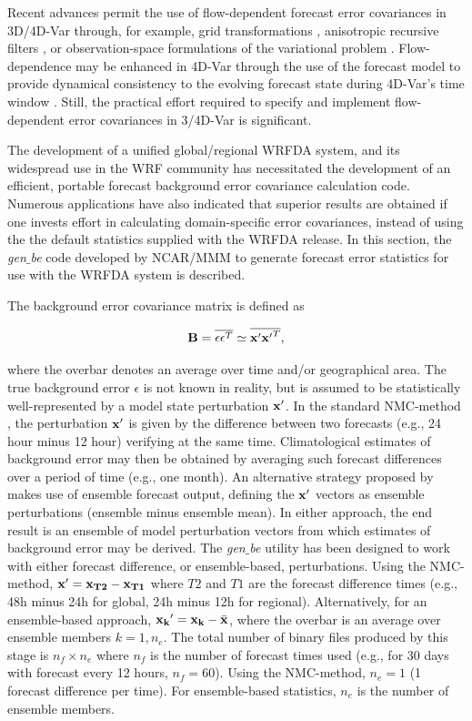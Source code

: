 Recent advances permit the use of flow-dependent forecast error
covariances in 3D/4D-Var through, for example, grid transformations
\citep{desroziers97}, anisotropic recursive filters
\citep{wu02, purser03},
or observation-space formulations of the variational 
problem \citep{daley01}. Flow-dependence may be enhanced in 4D-Var 
through the use of the forecast model to provide dynamical consistency to the evolving 
forecast state during 4D-Var's time window \citep{rabier98}. Still, the practical effort 
required to specify and implement flow-dependent error covariances in 3/4D-Var is 
significant.

The development of a unified global/regional WRFDA system, and its widespread use
in the WRF community has necessitated the development of an efficient, portable forecast 
background error covariance calculation code. Numerous applications have also indicated
that superior results are obtained if one invests effort in calculating domain-specific 
error covariances, instead of using the the default statistics supplied with the WRFDA 
release. In this section, the {\it gen$\_$be} code developed by NCAR/MMM to generate 
forecast error statistics for use with the WRFDA system is described.

The background error covariance matrix is defined as 

\begin{equation}
{\bf B}=\overline{\epsilon \epsilon^{T}} \simeq \overline{{\bf x'}{\bf x'}^{T}},
\label{var-b}
\end{equation}

\noindent where the overbar denotes an average over time and/or geographical area. The true 
background error $\epsilon$ is not known in reality, but is assumed to be statistically
well-represented by a model state perturbation ${\bf x'}$. In the standard NMC-method
\citep{parrish92}, the perturbation ${\bf x'}$ is given by the difference between 
two forecasts (e.g., 24 hour minus 12 hour) verifying at the same time. Climatological 
estimates of background error may then be obtained by averaging such forecast 
differences over a period of time (e.g., one month). An alternative strategy proposed by 
\citep{fisher03} makes use of ensemble forecast output, defining the ${\bf x'}$ vectors as 
ensemble perturbations (ensemble minus ensemble mean). In either approach, the end 
result is an ensemble of model perturbation vectors from which estimates of 
background error may be derived. The {\it gen$\_$be} utility has been designed to work with 
either forecast difference, or ensemble-based, perturbations.
Using the NMC-method, ${\bf x}'={\bf x_{T2}}-{\bf x_{T1}}$ where $T2$ and $T1$ 
are the forecast difference times (e.g., 48h minus 24h for global, 24h minus 12h for regional). 
Alternatively, for an ensemble-based approach, ${\bf x_{k}}'={\bf x_{k}}-\bar{\bf 
x}$, where the overbar is an average over ensemble members $k=1,n_{e}$. The total 
number of binary files produced by this stage is $n_{f} \times n_e$ where $n_f$ is the 
number of forecast times used (e.g., for 30 days with forecast every 12 hours, $n_f=60$). 
Using the NMC-method, $n_e=1$ (1 forecast difference per time). For ensemble-based 
statistics, $n_e$ is the number of ensemble members.

